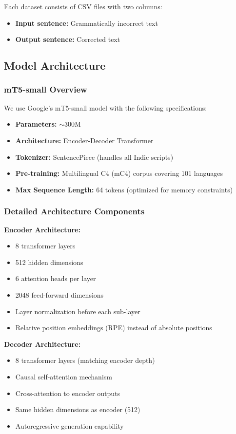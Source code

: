 \documentclass[12pt,a4paper]{article}
\begin{document}
Each dataset consists of CSV files with two columns:
\begin{itemize}
    \item \textbf{Input sentence:} Grammatically incorrect text
    \item \textbf{Output sentence:} Corrected text
\end{itemize}

\subsection{Model Architecture}

\subsubsection{mT5-small Overview}
We use Google's mT5-small model with the following specifications:
\begin{itemize}
    \item \textbf{Parameters:} $\sim$300M
    \item \textbf{Architecture:} Encoder-Decoder Transformer
    \item \textbf{Tokenizer:} SentencePiece (handles all Indic scripts)
    \item \textbf{Pre-training:} Multilingual C4 (mC4) corpus covering 101 languages
    \item \textbf{Max Sequence Length:} 64 tokens (optimized for memory constraints)
\end{itemize}

\subsubsection{Detailed Architecture Components}

\textbf{Encoder Architecture:}
\begin{itemize}
    \item 8 transformer layers
    \item 512 hidden dimensions
    \item 6 attention heads per layer
    \item 2048 feed-forward dimensions
    \item Layer normalization before each sub-layer
    \item Relative position embeddings (RPE) instead of absolute positions
\end{itemize}

\textbf{Decoder Architecture:}
\begin{itemize}
    \item 8 transformer layers (matching encoder depth)
    \item Causal self-attention mechanism
    \item Cross-attention to encoder outputs
    \item Same hidden dimensions as encoder (512)
    \item Autoregressive generation capability
\end{itemize}
\end{document}
